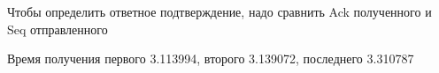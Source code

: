\documentclass[a4paper,11pt]{article}
\begin{document}
\begin{center}
\label{fig:image}
\end{center}

\begin{center}
\label{fig:image}
\end{center}
Чтобы определить ответное подтверждение, надо сравнить Ack полученного и Seq отправленного

Время получения первого 3.113994, второго 3.139072, последнего 3.310787
\end{document}

